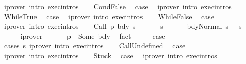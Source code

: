 \begin{isabellebody}
\ {\isacharparenleft}iprover\ intro{\isacharcolon}\ exec{\isachardot}intros{\isacharparenright}\isanewline
{}\isamarkupfalse%
\isanewline
\ \ \isamarkupfalse%
\ CondFalse\ \isamarkupfalse%
\ {\isacharquery}case\ \isamarkupfalse%
\ {\isacharparenleft}iprover\ intro{\isacharcolon}\ exec{\isachardot}intros{\isacharparenright}\isanewline
{}\isamarkupfalse%
\isanewline
\ \ \isamarkupfalse%
\ WhileTrue\ \isamarkupfalse%
\ {\isacharquery}case\ \isamarkupfalse%
\ {\isacharparenleft}iprover\ intro{\isacharcolon}\ exec{\isachardot}intros{\isacharparenright}\isanewline
{}\isamarkupfalse%
\isanewline
\ \ \isamarkupfalse%
\ WhileFalse\ \isamarkupfalse%
\ {\isacharquery}case\ \isamarkupfalse%
\ {\isacharparenleft}iprover\ intro{\isacharcolon}\ exec{\isachardot}intros{\isacharparenright}\isanewline
{}\isamarkupfalse%
\isanewline
\ \ \isamarkupfalse%
\ {\isacharparenleft}Call\ p\ bdy\ s{\isacharparenright}\ \isanewline
\ \ \isamarkupfalse%
\ \isamarkupfalse%
\ s{\isacharprime}\ \ \isanewline
\ \ \ \ {\isachardoublequoteopen}{\isasymGamma}{\isasymturnstile}{\isasymlangle}bdy{\isacharcomma}Normal\ s\ {\isasymrangle}\ {\isasymRightarrow}\ s{\isacharprime}{\isachardoublequoteclose}\isanewline
\ \ \ \ \isamarkupfalse%
\ iprover\isanewline
\ \ \isamarkupfalse%
\ \isamarkupfalse%
\ {\isachardoublequoteopen}{\isasymGamma}\ p\ {\isacharequal}\ Some\ bdy{\isachardoublequoteclose}\ \isamarkupfalse%
\ fact\isanewline
\ \ \isamarkupfalse%
\ \isamarkupfalse%
\ {\isacharquery}case\ \isanewline
\ \ \ \ \isamarkupfalse%
\ {\isacharparenleft}cases\ s{\isacharprime}{\isacharparenright}\ {\isacharparenleft}iprover\ intro{\isacharcolon}\ exec{\isachardot}intros{\isacharparenright}{\isacharplus}\isanewline
{}\isamarkupfalse%
\isanewline
\ \ \isamarkupfalse%
\ CallUndefined\ \isamarkupfalse%
\ {\isacharquery}case\ \isamarkupfalse%
\ {\isacharparenleft}iprover\ intro{\isacharcolon}\ exec{\isachardot}intros{\isacharparenright}\isanewline
{}\isamarkupfalse%
\isanewline
\ \ \isamarkupfalse%
\ Stuck\ \isamarkupfalse%
\ {\isacharquery}case\ \isamarkupfalse%
\ {\isacharparenleft}iprover\ intro{\isacharcolon}\ exec{\isachardot}intros{\isacharparenright}\isanewline

\end{isabellebody}
